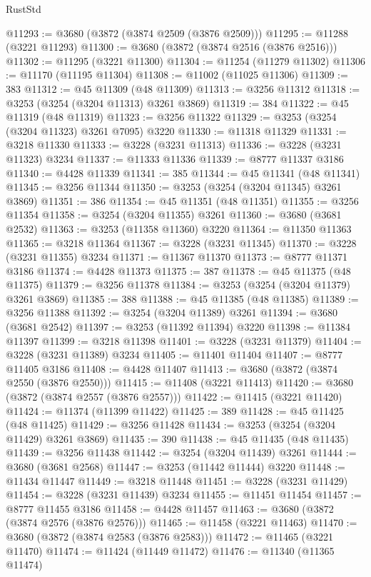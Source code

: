 \begin{lexlean}{RustStd}
\begin{coremodule}
@11293 := @3680 (@3872 (@3874 @2509 (@3876 @2509)))
@11295 := @11288 (@3221 @11293)
@11300 := @3680 (@3872 (@3874 @2516 (@3876 @2516)))
@11302 := @11295 (@3221 @11300)
@11304 := @11254 (@11279 @11302)
@11306 := @11170 (@11195 @11304)
@11308 := @11002 (@11025 @11306)
@11309 := 383
@11312 := @45 @11309 (@48 @11309)
@11313 := @3256 @11312
@11318 := @3253 (@3254 (@3204 @11313) @3261 @3869)
@11319 := 384
@11322 := @45 @11319 (@48 @11319)
@11323 := @3256 @11322
@11329 := @3253 (@3254 (@3204 @11323) @3261 @7095) @3220
@11330 := @11318 @11329
@11331 := @3218 @11330
@11333 := @3228 (@3231 @11313)
@11336 := @3228 (@3231 @11323) @3234
@11337 := @11333 @11336
@11339 := @8777 @11337 @3186
@11340 := @4428 @11339
@11341 := 385
@11344 := @45 @11341 (@48 @11341)
@11345 := @3256 @11344
@11350 := @3253 (@3254 (@3204 @11345) @3261 @3869)
@11351 := 386
@11354 := @45 @11351 (@48 @11351)
@11355 := @3256 @11354
@11358 := @3254 (@3204 @11355) @3261
@11360 := @3680 (@3681 @2532)
@11363 := @3253 (@11358 @11360) @3220
@11364 := @11350 @11363
@11365 := @3218 @11364
@11367 := @3228 (@3231 @11345)
@11370 := @3228 (@3231 @11355) @3234
@11371 := @11367 @11370
@11373 := @8777 @11371 @3186
@11374 := @4428 @11373
@11375 := 387
@11378 := @45 @11375 (@48 @11375)
@11379 := @3256 @11378
@11384 := @3253 (@3254 (@3204 @11379) @3261 @3869)
@11385 := 388
@11388 := @45 @11385 (@48 @11385)
@11389 := @3256 @11388
@11392 := @3254 (@3204 @11389) @3261
@11394 := @3680 (@3681 @2542)
@11397 := @3253 (@11392 @11394) @3220
@11398 := @11384 @11397
@11399 := @3218 @11398
@11401 := @3228 (@3231 @11379)
@11404 := @3228 (@3231 @11389) @3234
@11405 := @11401 @11404
@11407 := @8777 @11405 @3186
@11408 := @4428 @11407
@11413 := @3680 (@3872 (@3874 @2550 (@3876 @2550)))
@11415 := @11408 (@3221 @11413)
@11420 := @3680 (@3872 (@3874 @2557 (@3876 @2557)))
@11422 := @11415 (@3221 @11420)
@11424 := @11374 (@11399 @11422)
@11425 := 389
@11428 := @45 @11425 (@48 @11425)
@11429 := @3256 @11428
@11434 := @3253 (@3254 (@3204 @11429) @3261 @3869)
@11435 := 390
@11438 := @45 @11435 (@48 @11435)
@11439 := @3256 @11438
@11442 := @3254 (@3204 @11439) @3261
@11444 := @3680 (@3681 @2568)
@11447 := @3253 (@11442 @11444) @3220
@11448 := @11434 @11447
@11449 := @3218 @11448
@11451 := @3228 (@3231 @11429)
@11454 := @3228 (@3231 @11439) @3234
@11455 := @11451 @11454
@11457 := @8777 @11455 @3186
@11458 := @4428 @11457
@11463 := @3680 (@3872 (@3874 @2576 (@3876 @2576)))
@11465 := @11458 (@3221 @11463)
@11470 := @3680 (@3872 (@3874 @2583 (@3876 @2583)))
@11472 := @11465 (@3221 @11470)
@11474 := @11424 (@11449 @11472)
@11476 := @11340 (@11365 @11474)

\end{coremodule}
\end{lexlean}
